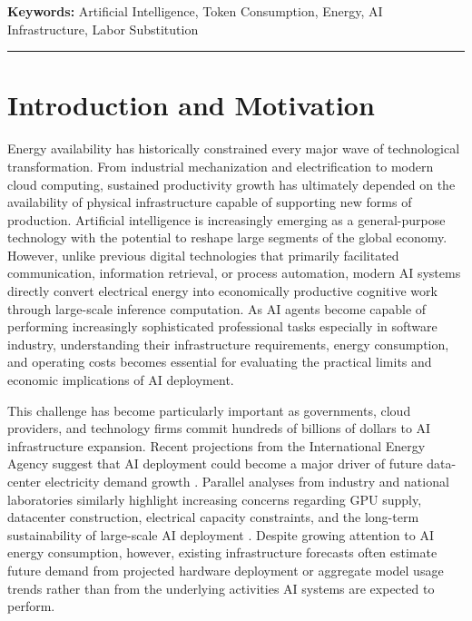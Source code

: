 \documentclass{article}
\begin{document}
\vspace{0.5em}
\noindent\textbf{Keywords:} Artificial Intelligence, Token Consumption, Energy, AI Infrastructure, Labor Substitution



\vspace{1em}
\hrule



\section{Introduction and Motivation}
\label{sec:introduction}

Energy availability has historically constrained every major wave of technological transformation. From industrial mechanization and electrification to modern cloud computing, sustained productivity growth has ultimately depended on the availability of physical infrastructure capable of supporting new forms of production. Artificial intelligence is increasingly emerging as a general-purpose technology with the potential to reshape large segments of the global economy. However, unlike previous digital technologies that primarily facilitated communication, information retrieval, or process automation, modern AI systems directly convert electrical energy into economically productive cognitive work through large-scale inference computation. As AI agents become capable of performing increasingly sophisticated professional tasks especially in software industry, understanding their infrastructure requirements, energy consumption, and operating costs becomes essential for evaluating the practical limits and economic implications of AI deployment.

This challenge has become particularly important as governments, cloud providers, and technology firms commit hundreds of billions of dollars to AI infrastructure expansion. Recent projections from the International Energy Agency suggest that AI deployment could become a major driver of future data-center electricity demand growth \citep{iea2025energyai}. Parallel analyses from industry and national laboratories similarly highlight increasing concerns regarding GPU supply, datacenter construction, electrical capacity constraints, and the long-term sustainability of large-scale AI deployment \citep{lbnl2024datacenterenergy}. Despite growing attention to AI energy consumption, however, existing infrastructure forecasts often estimate future demand from projected hardware deployment or aggregate model usage trends rather than from the underlying activities AI systems are expected to perform.
\end{document}
